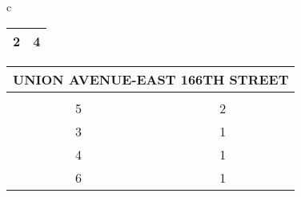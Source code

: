 \begin{table}[H]
\begin{tabular}{c}
\begin{tabular}{cc}
                        \multicolumn{1}{|c|}{2}                                                        & \multicolumn{1}{c|}{4}                                                             \\ \hline
\end{tabular}
                        \begin{tabular}{cc}
                        \multicolumn{2}{l}{UNION AVENUE-EAST 166TH STREET}                                                                                                                                   \\ \hline
                        \rowcolor{\ccorange} 
                        \multicolumn{1}{|c|}{\cellcolor{\ccorange}{\color[HTML]{FFFFFF} Building}} & \multicolumn{1}{c|}{\cellcolor{\ccorange}{\color[HTML]{FFFFFF} Total Repairs}} \\ \hline
                        \multicolumn{1}{|c|}{5}                                                        & \multicolumn{1}{c|}{2}                                                             \\ \hline
\multicolumn{1}{|c|}{3}                                                        & \multicolumn{1}{c|}{1}                                                             \\ \hline
\multicolumn{1}{|c|}{4}                                                        & \multicolumn{1}{c|}{1}                                                             \\ \hline
\multicolumn{1}{|c|}{6}                                                        & \multicolumn{1}{c|}{1}                                                             \\ \hline
\end{tabular} \\
                            

\end{tabular}
\end{table}
